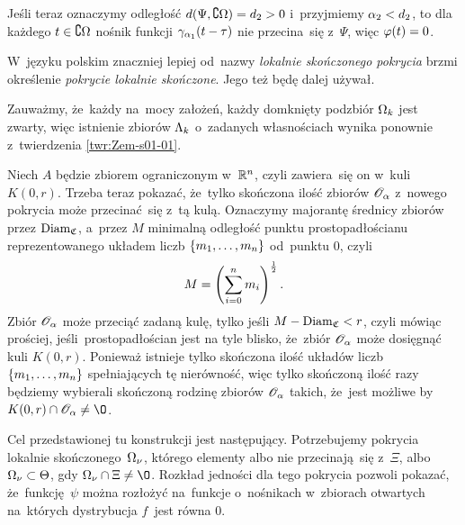 \documentclass[a4paper,11pt]{article}
\begin{document}
Jeśli teraz oznaczymy odległość $d( \Psi, \complement \Omega ) = d_{ 2 } > 0$
i~przyjmiemy $\alpha_{ 2 } < d_{ 2 }$, to dla każdego $t \in \complement \Omega$
nośnik funkcji $\gamma_{ \alpha_{ 1 } }( t - \tau )$ nie przecina~się
z~$\Psi$, więc $\varphi( t ) = 0$.

\vspace{\spaceFour}


\start {} W~języku polskim znaczniej lepiej od~nazwy
\emph{lokalnie skończonego pokrycia} brzmi określenie \emph{pokrycie
  lokalnie skończone}. Jego też będę dalej używał.

\vspace{\spaceFour}


\start {}  Zauważmy, że~każdy na~mocy
założeń, każdy domknięty podzbiór $\Omega_{ k }$ jest zwarty, więc
istnienie zbiorów $\Lambda_{ k }$ o~zadanych własnościach wynika ponownie
z~twierdzenia \eqref{twr:Zem-s01-01}.

\vspace{\spaceFour}


\start {}  Niech $A$ będzie zbiorem
ograniczonym w~$\mathbb{R}^{ n }$, czyli zawiera~się on w~kuli $K( 0, r )$. Trzeba
teraz pokazać, że~tylko skończona ilość zbiorów $\mathcal{O}_{ \alpha }$ z~nowego
pokrycia może przecinać~się z~tą kulą. Oznaczymy majorantę średnicy
zbiorów przez $\mathrm{Diam}_{ \mathfrak{ C } }$, a~przez $M$ minimalną
odległość punktu prostopadłościanu reprezentowanego układem liczb
$\{ m_{ 1 }, \ldots, m_{ n } \}$ od~punktu $0$, czyli
\begin{equation*}
  M = \left( \sum\limits_{ i = 0 }^{ n } m_{ i } \right)^{ \frac{ 1 }{ 2 } }.
\end{equation*}
Zbiór $\mathcal{O}_{ \alpha }$ może przeciąć zadaną kulę, tylko jeśli
$M - \mathrm{Diam}_{ \mathfrak{C} } < r$, czyli mówiąc prościej,
jeśli~prostopadłościan jest na tyle blisko, że~zbiór $\mathcal{O}_{ \alpha }$
może dosięgnąć kuli $K( 0, r )$. Ponieważ istnieje tylko skończona
ilość układów liczb $\{ m_{ 1 }, \ldots, m_{ n } \}$ spełniających tę
nierówność, więc tylko skończoną ilość razy będziemy wybierali
skończoną rodzinę zbiorów $\mathcal{O}_{ \alpha }$ takich, że~jest możliwe
by~$K( 0, r ) \cap \Oc_{ \al } \neq \O$.

\vspace{\spaceFour}


\start {} Cel przedstawionej tu konstrukcji jest następujący.
Potrzebujemy pokrycia lokalnie skończonego~$\Omega_{ \nu }$, którego
elementy albo nie przecinają~się z~$\Xi$, albo
$\Omega_{ \nu } \subset \Theta$, gdy $\Om_{ \nu } \cap \Xi \neq \O$.
Rozkład jedności dla tego pokrycia pozwoli pokazać, że~funkcję~$\psi$
można rozłożyć na~funkcje o~nośnikach w~zbiorach otwartych na~których
dystrybucja $f$~jest równa $0$.
\end{document}
